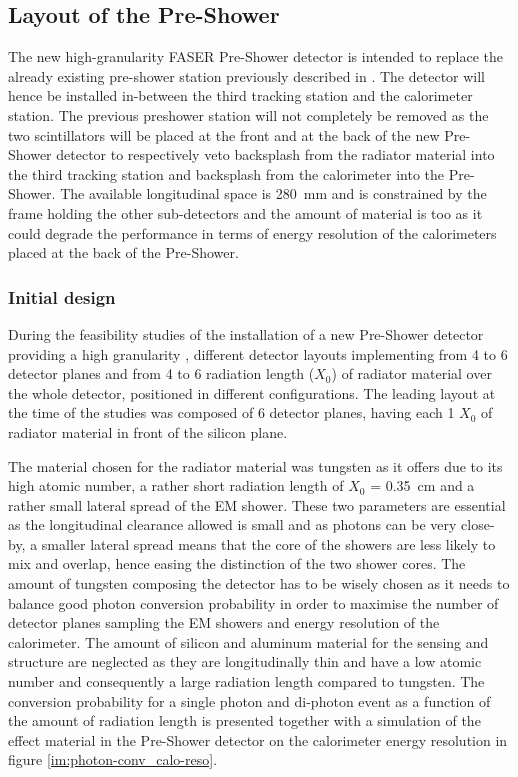 				
				
		\subsection{Layout of the Pre-Shower}
		
		The new high-granularity FASER Pre-Shower detector is intended to replace the already existing pre-shower station previously described in . The detector will hence be installed in-between the third tracking station and the calorimeter station. The previous preshower station will not completely be removed as the two scintillators will be placed at the front and at the back of the new Pre-Shower detector to respectively veto backsplash from the radiator material into the third tracking station and backsplash from the calorimeter into the Pre-Shower. The available longitudinal space is \SI{280}{\milli\meter} and is constrained by the frame holding the other sub-detectors and the amount of material is too as it could degrade the performance in terms of energy resolution of the calorimeters placed at the back of the Pre-Shower. 
		
		\subsubsection{Initial design}
		During the feasibility studies of the installation of a new Pre-Shower detector providing a high granularity \cite{PreShower_TP}, different detector layouts implementing from 4 to 6 detector planes and from 4 to 6 radiation length ($X_0$) of radiator material over the whole detector, positioned in different configurations. The leading layout at the time of the studies was composed of 6 detector planes, having each 1 $X_0$ of radiator material in front of the silicon plane. 
		
		The material chosen for the radiator material was tungsten as it offers due to its high atomic number, a rather short radiation length of $X_0$ = \SI{0.35}{\centi\meter} and a rather small lateral spread of the EM shower. These two parameters are essential as the longitudinal clearance allowed is small and as photons can be very close-by, a smaller lateral spread means that the core of the showers are less likely to mix and overlap, hence easing the distinction of the two shower cores. The amount of tungsten composing the detector has to be wisely chosen as it needs to balance good photon conversion probability in order to maximise the number of detector planes sampling the EM showers and energy resolution of the calorimeter. The amount of silicon and aluminum material for the sensing and structure are neglected as they are longitudinally thin and have a low atomic number and consequently a large radiation length compared to tungsten. The conversion probability for a single photon and di-photon event as a function of the amount of radiation length is presented together with a simulation of the effect material in the Pre-Shower detector on the calorimeter energy resolution in figure \ref{im:photon-conv_calo-reso}.
		
